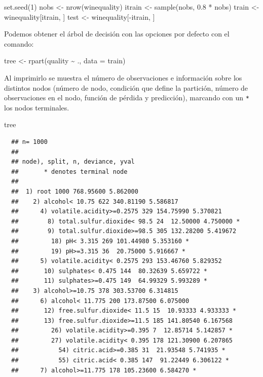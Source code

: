 \documentclass[
]{book}
\newenvironment{Shaded}{\begin{snugshade}}{\end{snugshade}}
\newcommand{\AttributeTok}[1]{\textcolor[rgb]{0.77,0.63,0.00}{#1}}
\newcommand{\DecValTok}[1]{\textcolor[rgb]{0.00,0.00,0.81}{#1}}
\newcommand{\FloatTok}[1]{\textcolor[rgb]{0.00,0.00,0.81}{#1}}
\newcommand{\FunctionTok}[1]{\textcolor[rgb]{0.00,0.00,0.00}{#1}}
\newcommand{\NormalTok}[1]{#1}
\newcommand{\OtherTok}[1]{\textcolor[rgb]{0.56,0.35,0.01}{#1}}
\newcommand{\SpecialCharTok}[1]{\textcolor[rgb]{0.00,0.00,0.00}{#1}}
\theoremstyle{break}
\theoremstyle{nonumberplain}
\begin{document}
\begin{Shaded}
\begin{Highlighting}[]
\FunctionTok{set.seed}\NormalTok{(}\DecValTok{1}\NormalTok{)}
\NormalTok{nobs }\OtherTok{\textless{}{-}} \FunctionTok{nrow}\NormalTok{(winequality)}
\NormalTok{itrain }\OtherTok{\textless{}{-}} \FunctionTok{sample}\NormalTok{(nobs, }\FloatTok{0.8} \SpecialCharTok{*}\NormalTok{ nobs)}
\NormalTok{train }\OtherTok{\textless{}{-}}\NormalTok{ winequality[itrain, ]}
\NormalTok{test }\OtherTok{\textless{}{-}}\NormalTok{ winequality[}\SpecialCharTok{{-}}\NormalTok{itrain, ]}
\end{Highlighting}
\end{Shaded}

Podemos obtener el árbol de decisión con las opciones por defecto con el comando:

\begin{Shaded}
\begin{Highlighting}[]
\NormalTok{tree }\OtherTok{\textless{}{-}} \FunctionTok{rpart}\NormalTok{(quality }\SpecialCharTok{\textasciitilde{}}\NormalTok{ ., }\AttributeTok{data =}\NormalTok{ train)}
\end{Highlighting}
\end{Shaded}

Al imprimirlo se muestra el número de observaciones e información
sobre los distintos nodos (número de nodo, condición que define la partición,
número de observaciones en el nodo, función de pérdida y predicción),
marcando con un \texttt{*} los nodos terminales.

\begin{Shaded}
\begin{Highlighting}[]
\NormalTok{tree}
\end{Highlighting}
\end{Shaded}

\begin{verbatim}
  ## n= 1000 
  ## 
  ## node), split, n, deviance, yval
  ##       * denotes terminal node
  ## 
  ##  1) root 1000 768.95600 5.862000  
  ##    2) alcohol< 10.75 622 340.81190 5.586817  
  ##      4) volatile.acidity>=0.2575 329 154.75990 5.370821  
  ##        8) total.sulfur.dioxide< 98.5 24  12.50000 4.750000 *
  ##        9) total.sulfur.dioxide>=98.5 305 132.28200 5.419672  
  ##         18) pH< 3.315 269 101.44980 5.353160 *
  ##         19) pH>=3.315 36  20.75000 5.916667 *
  ##      5) volatile.acidity< 0.2575 293 153.46760 5.829352  
  ##       10) sulphates< 0.475 144  80.32639 5.659722 *
  ##       11) sulphates>=0.475 149  64.99329 5.993289 *
  ##    3) alcohol>=10.75 378 303.53700 6.314815  
  ##      6) alcohol< 11.775 200 173.87500 6.075000  
  ##       12) free.sulfur.dioxide< 11.5 15  10.93333 4.933333 *
  ##       13) free.sulfur.dioxide>=11.5 185 141.80540 6.167568  
  ##         26) volatile.acidity>=0.395 7  12.85714 5.142857 *
  ##         27) volatile.acidity< 0.395 178 121.30900 6.207865  
  ##           54) citric.acid>=0.385 31  21.93548 5.741935 *
  ##           55) citric.acid< 0.385 147  91.22449 6.306122 *
  ##      7) alcohol>=11.775 178 105.23600 6.584270 *
\end{verbatim}
\end{document}
